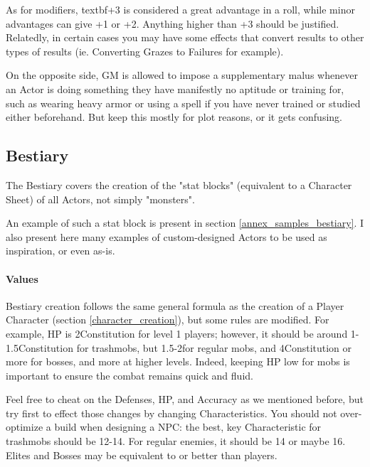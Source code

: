 As for modifiers, textbf{+3 is considered a great advantage} in a roll, while minor advantages can give +1 or +2. Anything higher than +3 should be justified. Relatedly, in certain cases you may have some effects that convert results to other types of results (ie. Converting Grazes to Failures for example).

On the opposite side, GM is allowed to impose a supplementary malus whenever an Actor is doing something they have manifestly no aptitude or training for, such as wearing heavy armor or using a spell if you have never trained or studied either beforehand. But keep this mostly for plot reasons, or it gets confusing.


\subsection{Bestiary}

\label{bestiary}

The Bestiary covers the creation of the "stat blocks" (equivalent to a Character Sheet) of all Actors, not simply "monsters".


\begin{rpg-examplebox}
    An example of such a stat block is present in section \ref{annex_samples_bestiary}. I also present here many examples of custom-designed Actors to be used as inspiration, or even as-is.
\end{rpg-examplebox}

\paragraph{Values}

Bestiary creation follows the same general formula as the creation of a Player Character (section \ref{character_creation}), but some rules are modified. For example, HP is 2\texttimes Constitution for level 1 players; however, it should be around 1-1.5\texttimes Constitution for trashmobs, but 1.5-2\texttimes for regular mobs, and 4\texttimes Constitution or more for bosses, and more at higher levels. Indeed, keeping HP low for mobs is important to ensure the combat remains quick and fluid.


Feel free to cheat on the Defenses, HP, and Accuracy as we mentioned before, but try first to effect those changes by changing Characteristics. You should not over-optimize a build when designing a NPC: the best, key Characteristic for trashmobs should be 12-14. For regular enemies, it should be 14 or maybe 16. Elites and Bosses may be equivalent to or better than players. 

